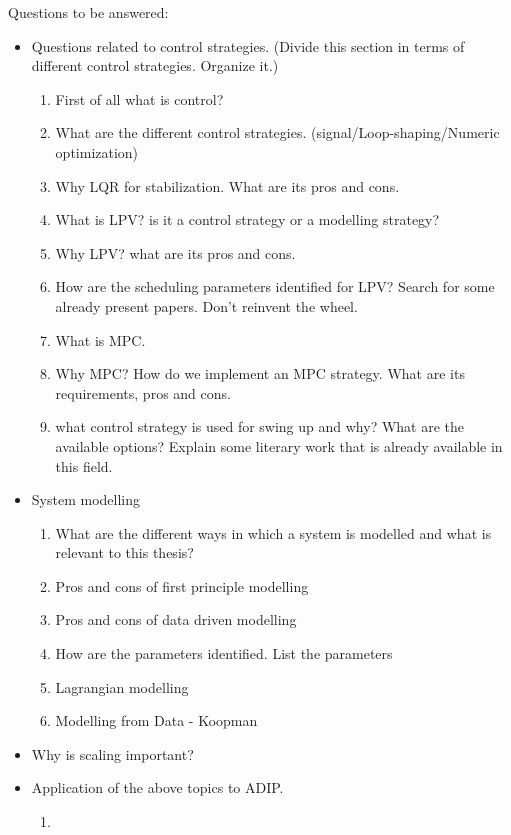 Questions to be answered: 
\begin{itemize}
    \item Questions related to control strategies. (Divide this section in terms of different control strategies. Organize it.)
    \begin{enumerate}
    \item First of all what is control?
    \item What are the different control strategies. (signal/Loop-shaping/Numeric optimization)
    \item Why LQR for stabilization. What are its pros and cons.
    \item What is LPV? is it a control strategy or a modelling strategy?
    \item Why LPV? what are its pros and cons.
    \item How are the scheduling parameters identified for LPV? Search for some already present papers. Don't reinvent the wheel.
    \item What is MPC.
    \item Why MPC? How do we implement an MPC strategy. What are its requirements, pros and cons.
    \item what control strategy is used for swing up and why? What are the available options? Explain some literary work that is already available in this field.
    \end{enumerate}
    \item System modelling
    \begin{enumerate}
        \item What are the different ways in which a system is modelled and what is relevant to this thesis? 
        \item Pros and cons of first principle modelling 
        \item Pros and cons of data driven modelling 
        \item How are the parameters identified. List the parameters
        \item Lagrangian modelling
        \item Modelling from Data - Koopman
    \end{enumerate}
    \item Why is scaling important?
    \item Application of the above topics to ADIP.
    \begin{enumerate}
        \item 
    \end{enumerate}
\end{itemize}

